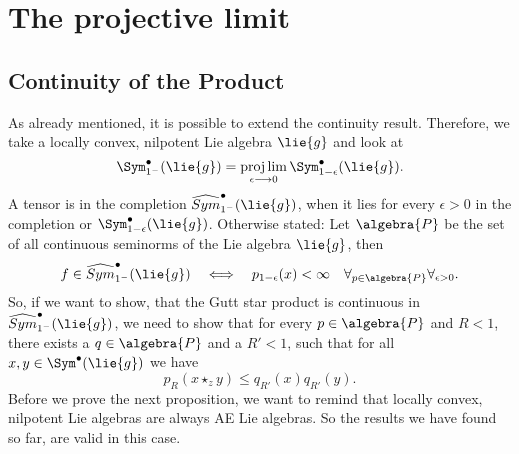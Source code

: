  
\section{The projective limit} 
\label{sec:chap6_ProjLim} 

\subsection{Continuity of the Product}

As already mentioned, it is possible to extend the continuity result. 
Therefore, we take a locally convex, nilpotent Lie algebra $\lie{g}$ and look 
at
\begin{equation*}
	\Sym_{1^-}^{\bullet}(\lie{g})
	=
	\projlim_{\epsilon \longrightarrow 0}
	\Sym_{1 - \epsilon}^{\bullet}(\lie{g}).
\end{equation*}
A tensor is in the completion $\widehat{Sym}_{1^-}^{\bullet}(\lie{g})$, 
when it lies for every $\epsilon > 0$ in the completion or 
$\Sym_{1 - \epsilon}^{\bullet}(\lie{g})$. Otherwise stated: Let $\algebra{P}$ 
be the set of all continuous seminorms of the Lie algebra $\lie{g}$, then 
\begin{equation*}
	f \in \widehat{Sym}_{1^-}^{\bullet}(\lie{g})
	\quad \Longleftrightarrow \quad
	p_{1 - \epsilon} (x) 
	< 
	\infty
	\quad
	\forall_{p \in \algebra{P}}
	\forall_{\epsilon > 0}.
\end{equation*}
So, if we want to show, that the Gutt star product is continuous in 
$\widehat{Sym}_{1^-}^{\bullet}(\lie{g})$, we need to show that for every 
$p \in \algebra{P}$ and  $R < 1$, there exists a $q \in \algebra{P}$ and a 
$R' < 1$, such that for all $x,y \in \Sym^{\bullet}(\lie{g})$ we have
\begin{equation*}
	p_R \left(
		x \star_z y
	\right)
	\leq
	q_{R'}(x)
	q_{R'}(y).
\end{equation*}
Before we prove the next proposition, we want to remind that locally convex, 
nilpotent Lie algebras are always AE Lie algebras. So the results we have 
found so far, are valid in this case.
